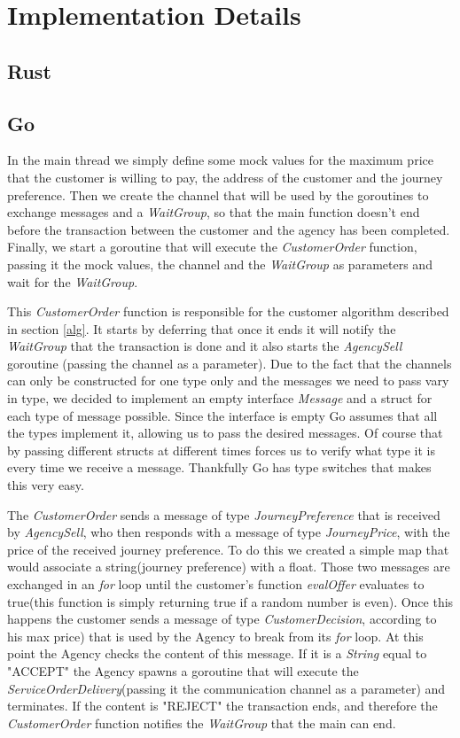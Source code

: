 \documentclass[runningheads]{llncs}
\begin{document}
\section{Implementation Details}
\subsection{Rust}
\lipsum[1]
\subsection{Go}
In the main thread we simply define some mock values for the maximum price that the customer is willing to pay, the address of the customer and the journey preference. Then we create the channel that will be used by the goroutines to exchange messages and a {\it WaitGroup}, so that the main function doesn't end before the transaction between the customer and the agency has been completed. Finally, we start a goroutine that will execute the {\it CustomerOrder} function, passing it the mock values, the channel and the {\it WaitGroup} as parameters and wait for the {\it WaitGroup}.

This {\it CustomerOrder} function is responsible for the customer algorithm described in section \ref{alg}. It starts by deferring that once it ends it will notify the {\it WaitGroup} that the transaction is done and it also starts the {\it AgencySell} goroutine (passing the channel as a parameter).
Due to the fact that the channels can only be constructed for one type only and the messages we need to pass vary in type, we decided to implement an empty interface {\it Message} and a struct for each type  of message possible. Since the interface is empty Go assumes that all the types implement it, allowing us to pass the desired messages. Of course that by passing different structs at different times forces us to verify what type it is every time we receive a message. Thankfully Go has type switches that makes this very easy.

The {\it CustomerOrder} sends a message of type {\it JourneyPreference} that is received by {\it AgencySell}, who then responds with a message of type {\it JourneyPrice}, with the price of the received journey preference. To do this we created a simple map that would associate a string(journey preference) with a float. Those two messages are exchanged in an {\it for} loop until the customer's function {\it evalOffer} evaluates to true(this function is simply returning true if a random number is even). Once this happens the customer sends a message of type {\it CustomerDecision}, according to his max price) that is used by the Agency to break from its {\it for} loop. At this point the Agency checks the content of this message. If it is a {\it String} equal to "ACCEPT" the Agency spawns a goroutine that will execute the {\it ServiceOrderDelivery}(passing it the communication channel as a parameter) and terminates. If the content is "REJECT" the transaction ends, and therefore the {\it CustomerOrder} function notifies the {\it WaitGroup} that the main can end.
\end{document}
